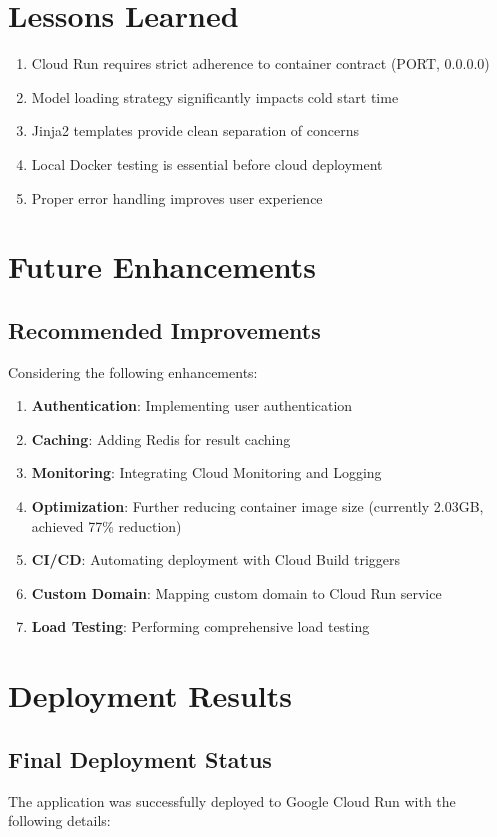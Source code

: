 \documentclass[12pt,a4paper]{article}
\begin{document}
\section{Lessons Learned}

\begin{enumerate}
    \item Cloud Run requires strict adherence to container contract (PORT, 0.0.0.0)
    \item Model loading strategy significantly impacts cold start time
    \item Jinja2 templates provide clean separation of concerns
    \item Local Docker testing is essential before cloud deployment
    \item Proper error handling improves user experience
\end{enumerate}

\section{Future Enhancements}

\subsection{Recommended Improvements}
Considering the following enhancements:
\begin{enumerate}
    \item \textbf{Authentication}: Implementing user authentication
    \item \textbf{Caching}: Adding Redis for result caching
    \item \textbf{Monitoring}: Integrating Cloud Monitoring and Logging
    \item \textbf{Optimization}: Further reducing container image size (currently 2.03GB, achieved 77\% reduction)
    \item \textbf{CI/CD}: Automating deployment with Cloud Build triggers
    \item \textbf{Custom Domain}: Mapping custom domain to Cloud Run service
    \item \textbf{Load Testing}: Performing comprehensive load testing
\end{enumerate}

\section{Deployment Results}

\subsection{Final Deployment Status}
The application was successfully deployed to Google Cloud Run with the following details:
\end{document}
